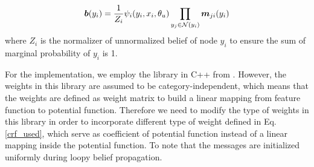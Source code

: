 \begin{equation}
\label{belief}
\boldsymbol b(y_i) = \frac{1}{Z_i}\psi_i(y_i, x_i, \theta_u) \prod_{y_j\in\mathcal{N}(y_i)}\boldsymbol m_{ji}(y_i)
\end{equation}
where $Z_i$ is the normalizer of unnormalized belief of node $y_i$ to ensure the sum of marginal probability of $y_i$ is 1. 

For the implementation, we employ the library in C++ from \cite{Ruiz-Sarmiento-REACTS-2015}. However, the weights in this library are assumed to be category-independent, which means that the weights are defined as weight matrix to build a linear mapping from feature function to potential function. Therefore we need to modify the type of weights in this library in order to incorporate different type of weight defined in Eq. \ref{crf_used}, which serve as coefficient of potential function instead of a linear mapping inside the potential function. To note that the messages are initialized uniformly during loopy belief propagation.



